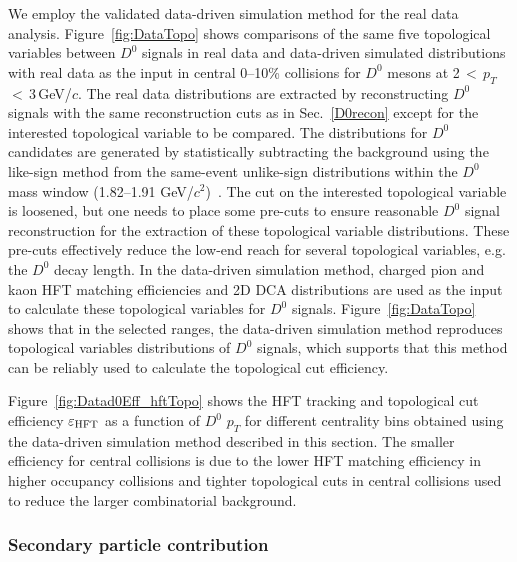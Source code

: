 \documentclass[%
 reprint,	
showpacs,
 amsmath,amssymb,
 aps,
 prc,
]{revtex4-1}
\begin{document}
We employ the validated data-driven simulation method for the real data analysis. Figure~\ref{fig:DataTopo} shows comparisons of the same five topological variables between $D^0$ signals in real data and data-driven simulated distributions with real data as the input in central 0--10\% collisions for $D^0$ mesons at 2\,$<$\,$p_{T}$\,$<$\,3\,GeV/$c$. The real data distributions are extracted by reconstructing $D^0$ signals with the same reconstruction cuts as in Sec.~\ref{D0recon} except for the interested topological variable to be compared. The distributions for $D^0$ candidates are generated by statistically subtracting the background using the like-sign method from the same-event unlike-sign distributions within the $D^0$ mass window (1.82--1.91 GeV/$c^2$)~\cite{Star_D_v2,Star_D_pp}. The cut on the interested topological variable is loosened, but one needs to place some pre-cuts to ensure reasonable $D^0$ signal reconstruction for the extraction of these topological variable distributions. These pre-cuts effectively reduce the low-end reach for several topological variables, e.g. the $D^0$ decay length. In the data-driven simulation method, charged pion and kaon HFT matching efficiencies and 2D DCA distributions are used as the input to calculate these topological variables for $D^0$ signals. Figure~\ref{fig:DataTopo} shows that in the selected ranges, the data-driven simulation method reproduces topological variables distributions of $D^0$ signals, which supports that this method can be reliably used to calculate the topological cut efficiency.


Figure~\ref{fig:Datad0Eff_hftTopo} shows the HFT tracking and topological cut efficiency $\varepsilon_{\rm HFT}$ as a function of $D^0$ $p_{T}$ for different centrality bins obtained using the data-driven simulation method described in this section. The smaller efficiency for central collisions is due to the lower HFT matching efficiency in higher occupancy collisions and tighter topological cuts in central collisions used to reduce the larger combinatorial background. 

\subsubsection{Secondary particle contribution}
\label{correction:hft:secondary}
\end{document}
